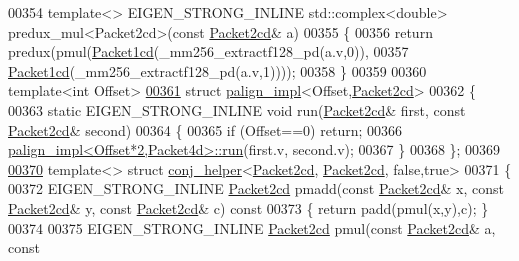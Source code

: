 \begin{DoxyCode}
00354 \textcolor{keyword}{template}<> EIGEN\_STRONG\_INLINE std::complex<double> predux\_mul<Packet2cd>(\textcolor{keyword}{const} 
      \hyperlink{struct_eigen_1_1internal_1_1_packet2cd}{Packet2cd}& a)
00355 \{
00356   \textcolor{keywordflow}{return} predux(pmul(\hyperlink{struct_eigen_1_1internal_1_1_packet1cd}{Packet1cd}(\_mm256\_extractf128\_pd(a.v,0)),
00357                      \hyperlink{struct_eigen_1_1internal_1_1_packet1cd}{Packet1cd}(\_mm256\_extractf128\_pd(a.v,1))));
00358 \}
00359 
00360 \textcolor{keyword}{template}<\textcolor{keywordtype}{int} Offset>
\hyperlink{struct_eigen_1_1internal_1_1palign__impl_3_01_offset_00_01_packet2cd_01_4}{00361} \textcolor{keyword}{struct }\hyperlink{struct_eigen_1_1internal_1_1palign__impl}{palign\_impl}<Offset,\hyperlink{struct_eigen_1_1internal_1_1_packet2cd}{Packet2cd}>
00362 \{
00363   \textcolor{keyword}{static} EIGEN\_STRONG\_INLINE \textcolor{keywordtype}{void} run(\hyperlink{struct_eigen_1_1internal_1_1_packet2cd}{Packet2cd}& first, \textcolor{keyword}{const} \hyperlink{struct_eigen_1_1internal_1_1_packet2cd}{Packet2cd}& second)
00364   \{
00365     \textcolor{keywordflow}{if} (Offset==0) \textcolor{keywordflow}{return};
00366     \hyperlink{struct_eigen_1_1internal_1_1palign__impl}{palign\_impl<Offset*2,Packet4d>::run}(first.v, second.v);
00367   \}
00368 \};
00369 
\hyperlink{struct_eigen_1_1internal_1_1conj__helper_3_01_packet2cd_00_01_packet2cd_00_01false_00_01true_01_4}{00370} \textcolor{keyword}{template}<> \textcolor{keyword}{struct }\hyperlink{struct_eigen_1_1internal_1_1conj__helper}{conj\_helper}<\hyperlink{struct_eigen_1_1internal_1_1_packet2cd}{Packet2cd}, \hyperlink{struct_eigen_1_1internal_1_1_packet2cd}{Packet2cd}, false,true>
00371 \{
00372   EIGEN\_STRONG\_INLINE \hyperlink{struct_eigen_1_1internal_1_1_packet2cd}{Packet2cd} pmadd(\textcolor{keyword}{const} \hyperlink{struct_eigen_1_1internal_1_1_packet2cd}{Packet2cd}& x, \textcolor{keyword}{const} 
      \hyperlink{struct_eigen_1_1internal_1_1_packet2cd}{Packet2cd}& y, \textcolor{keyword}{const} \hyperlink{struct_eigen_1_1internal_1_1_packet2cd}{Packet2cd}& c)\textcolor{keyword}{ const}
00373 \textcolor{keyword}{  }\{ \textcolor{keywordflow}{return} padd(pmul(x,y),c); \}
00374 
00375   EIGEN\_STRONG\_INLINE \hyperlink{struct_eigen_1_1internal_1_1_packet2cd}{Packet2cd} pmul(\textcolor{keyword}{const} \hyperlink{struct_eigen_1_1internal_1_1_packet2cd}{Packet2cd}& a, \textcolor{keyword}{const} 

\end{DoxyCode}
